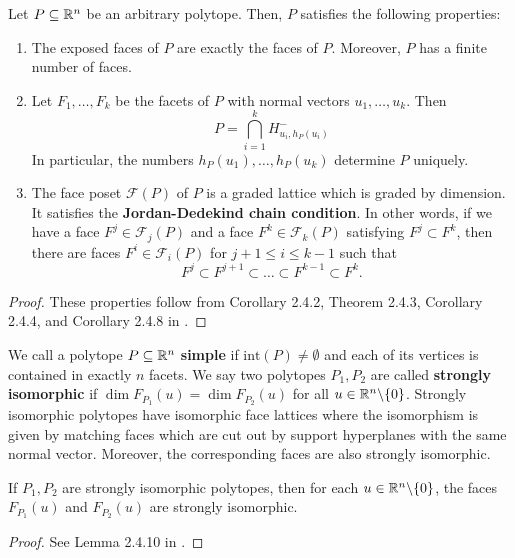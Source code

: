 \documentclass{puthesis-UG}
\begin{document}
\begin{prop}
	Let $P \subseteq \mathbb{R}^n$ be an arbitrary polytope. Then, $P$ satisfies the following properties: 
	\begin{enumerate}[label = (\alph*)]
		\item The exposed faces of $P$ are exactly the faces of $P$. Moreover, $P$ has a finite number of faces. 
		\item Let $F_1, \ldots, F_k$ be the facets of $P$ with normal vectors $u_1, \ldots, u_k$. Then 
		\[
			P = \bigcap_{i = 1}^k H_{u_i, h_P(u_i)}^-
		\]
		In particular, the numbers $h_P(u_1), \ldots, h_P(u_k)$ determine $P$ uniquely. 

		\item The face poset $\mathcal{F}(P)$ of $P$ is a graded lattice which is graded by dimension. It satisfies the \textbf{Jordan-Dedekind chain condition}. In other words, if we have a face $F^j \in \mathcal{F}_j(P)$ and a face $F^k \in \mathcal{F}_k(P)$ satisfying $F^j \subset F^k$, then there are faces $F^i \in \mathcal{F}_i(P)$ for $j+1 \leq i \leq k-1$ such that 
		\[
			F^j \subset F^{j+1} \subset \ldots \subset F^{k-1} \subset F^k.
		\]
	\end{enumerate}
\end{prop}

\begin{proof}
	These properties follow from Corollary 2.4.2, Theorem 2.4.3, Corollary 2.4.4, and Corollary 2.4.8 in \cite{schneider_2013}. 
\end{proof}

We call a polytope $P \subseteq \mathbb{R}^n$ \textbf{simple} if $\text{int} (P) \neq \emptyset$ and each of its vertices is contained in exactly $n$ facets. We say two polytopes $P_1, P_2$ are called \textbf{strongly isomorphic} if $\dim F_{P_1}(u) = \dim F_{P_2}(u)$ for all $u \in \mathbb{R}^n \backslash \{0\}$. Strongly isomorphic polytopes have isomorphic face lattices where the isomorphism is given by matching faces which are cut out by support hyperplanes with the same normal vector. Moreover, the corresponding faces are also strongly isomorphic. 

\begin{lem}
	If $P_1, P_2$ are strongly isomorphic polytopes, then for each $u \in \mathbb{R}^n \backslash \{0\}$, the faces $F_{P_1}(u)$ and $F_{P_2}(u)$ are strongly isomorphic. 
\end{lem}
\begin{proof}
	See Lemma 2.4.10 in \cite{schneider_2013}. 
\end{proof}
\end{document}
